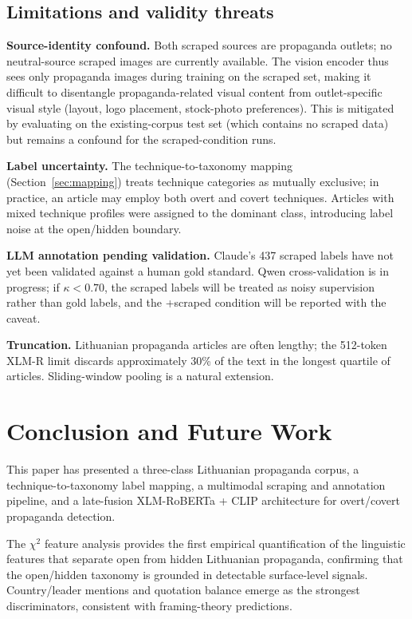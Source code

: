 \documentclass[12pt,a4paper]{article}
\begin{document}
\subsection{Limitations and validity threats}

\textbf{Source-identity confound.}
Both scraped sources are propaganda outlets; no neutral-source scraped images
are currently available.
The vision encoder thus sees only propaganda images during training on the
scraped set, making it difficult to disentangle propaganda-related visual
content from outlet-specific visual style (layout, logo placement, stock-photo
preferences).
This is mitigated by evaluating on the existing-corpus test set (which
contains no scraped data) but remains a confound for the scraped-condition runs.

\textbf{Label uncertainty.}
The technique-to-taxonomy mapping (Section~\ref{sec:mapping}) treats
technique categories as mutually exclusive; in practice, an article may employ
both overt and covert techniques.
Articles with mixed technique profiles were assigned to the dominant class,
introducing label noise at the open/hidden boundary.

\textbf{LLM annotation pending validation.}
Claude's 437 scraped labels have not yet been validated against a human gold
standard.
Qwen cross-validation is in progress; if $\kappa < 0.70$, the scraped labels
will be treated as noisy supervision rather than gold labels, and the
+scraped condition will be reported with the caveat.

\textbf{Truncation.}
Lithuanian propaganda articles are often lengthy; the 512-token XLM-R limit
discards approximately 30\% of the text in the longest quartile of articles.
Sliding-window pooling is a natural extension.


\section{Conclusion and Future Work}
\label{sec:conclusion}

This paper has presented a three-class Lithuanian propaganda corpus,
a technique-to-taxonomy label mapping, a multimodal scraping and annotation
pipeline, and a late-fusion XLM-RoBERTa + CLIP architecture for
overt/covert propaganda detection.

The $\chi^2$ feature analysis provides the first empirical quantification of
the linguistic features that separate open from hidden Lithuanian propaganda,
confirming that the open/hidden taxonomy is grounded in detectable surface-level
signals.
Country/leader mentions and quotation balance emerge as the strongest
discriminators, consistent with framing-theory predictions.
\end{document}
